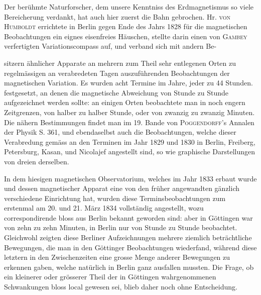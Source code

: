 Der berühmte Naturforscher, dem unsere Kenntniss des Erdmagnetismus so viele Bereicherung verdankt, hat auch hier zuerst die Bahn gebrochen. Hr. \textsc{von Humboldt} errichtete in Berlin gegen Ende des Jahrs 1828 für die magnetischen Beobachtungen ein eignes eisenfreies Häuschen, stellte darin einen von \textsc{Gambey} verfertigten Variationscompass auf, und verband sich mit andern Be-
\par\clearpage
{}
\noindent sitzern ähnlicher Apparate an mehrern zum Theil sehr entlegenen Orten zu regelmässigen an verabredeten Tagen auszuführenden Beobachtungen der magnetischen Variation. Es wurden acht Termine im Jahre, jeder zu 44 Stunden. festgesetzt, an denen die magnetische Abweichung von Stunde zu Stunde aufgezeichnet werden sollte: an einigen Orten beobachtete man in noch engern Zeitgrenzen, von halber zu halber Stunde, oder von zwanzig zu zwanzig Minuten. Die nähern Bestimmungen findet man im 19. Bande von \textsc{Poggendorff}'s Annalen der Physik S. 361, und ebendaselbst auch die Beobachtungen, welche dieser Verabredung gemäss an den Terminen im Jahr 1829 und 1830 in Berlin, Freiberg, Petersburg, Kasan, und Nicolajef angestellt sind, so wie graphische Darstellungen von dreien derselben.

In dem hiesigen magnetischen Observatorium, welches im Jahr 1833 erbaut wurde und dessen magnetischer Apparat eine von den früher angewandten gänzlich verschiedene Einrichtung hat, wurden diese Terminsbeobachtungen zum erstenmal am 20. und 21. März 1834 vollständig angestellt, wozu correspondirende bloss aus Berlin bekannt geworden sind: aber in Göttingen war von zehn zu zehn Minuten, in Berlin nur von Stunde zu Stunde beobachtet. Gleichwohl zeigten diese Berliner Aufzeichnungen mehrere ziemlich beträchtliche Bewegungen, die man in den Göttinger Beobachtungen wiederfand, während diese letztern in den Zwischenzeiten eine grosse Menge anderer Bewegungen zu erkennen gaben, welche natürlich in Berlin ganz ausfallen mussten. Die Frage, ob ein kleinerer oder grösserer Theil der in Göttingen wahrgenommenen Schwankungen bloss local gewesen sei, blieb daher noch ohne Entscheidung.

